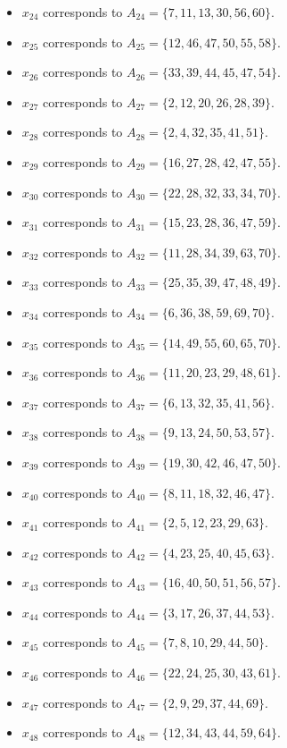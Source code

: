 \documentclass[11pt]{article}
\begin{document}
\begin{itemize}
\item $x_{24}$ corresponds to $A_{24}=\{7, 11, 13, 30, 56, 60\}$.
\item $x_{25}$ corresponds to $A_{25}=\{12, 46, 47, 50, 55, 58\}$.
\item $x_{26}$ corresponds to $A_{26}=\{33, 39, 44, 45, 47, 54\}$.
\item $x_{27}$ corresponds to $A_{27}=\{2, 12, 20, 26, 28, 39\}$.
\item $x_{28}$ corresponds to $A_{28}=\{2, 4, 32, 35, 41, 51\}$.
\item $x_{29}$ corresponds to $A_{29}=\{16, 27, 28, 42, 47, 55\}$.
\item $x_{30}$ corresponds to $A_{30}=\{22, 28, 32, 33, 34, 70\}$.
\item $x_{31}$ corresponds to $A_{31}=\{15, 23, 28, 36, 47, 59\}$.
\item $x_{32}$ corresponds to $A_{32}=\{11, 28, 34, 39, 63, 70\}$.
\item $x_{33}$ corresponds to $A_{33}=\{25, 35, 39, 47, 48, 49\}$.
\item $x_{34}$ corresponds to $A_{34}=\{6, 36, 38, 59, 69, 70\}$.
\item $x_{35}$ corresponds to $A_{35}=\{14, 49, 55, 60, 65, 70\}$.
\item $x_{36}$ corresponds to $A_{36}=\{11, 20, 23, 29, 48, 61\}$.
\item $x_{37}$ corresponds to $A_{37}=\{6, 13, 32, 35, 41, 56\}$.
\item $x_{38}$ corresponds to $A_{38}=\{9, 13, 24, 50, 53, 57\}$.
\item $x_{39}$ corresponds to $A_{39}=\{19, 30, 42, 46, 47, 50\}$.
\item $x_{40}$ corresponds to $A_{40}=\{8, 11, 18, 32, 46, 47\}$.
\item $x_{41}$ corresponds to $A_{41}=\{2, 5, 12, 23, 29, 63\}$.
\item $x_{42}$ corresponds to $A_{42}=\{4, 23, 25, 40, 45, 63\}$.
\item $x_{43}$ corresponds to $A_{43}=\{16, 40, 50, 51, 56, 57\}$.
\item $x_{44}$ corresponds to $A_{44}=\{3, 17, 26, 37, 44, 53\}$.
\item $x_{45}$ corresponds to $A_{45}=\{7, 8, 10, 29, 44, 50\}$.
\item $x_{46}$ corresponds to $A_{46}=\{22, 24, 25, 30, 43, 61\}$.
\item $x_{47}$ corresponds to $A_{47}=\{2, 9, 29, 37, 44, 69\}$.
\item $x_{48}$ corresponds to $A_{48}=\{12, 34, 43, 44, 59, 64\}$.

\end{itemize}
\end{document}
